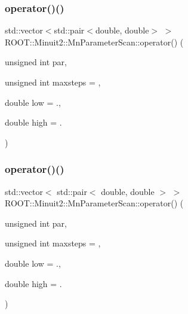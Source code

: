\mbox{\label{classROOT_1_1Minuit2_1_1MnParameterScan_aea28c9f299305c9ee1a0f5ad4b44a4e3}} 
\subsubsection{\texorpdfstring{operator()()}{operator()()}\hspace{0.1cm}{\footnotesize\ttfamily [1/2]}}
{\footnotesize\ttfamily std\+::vector$<$std\+::pair$<$double, double$>$ $>$ R\+O\+O\+T\+::\+Minuit2\+::\+Mn\+Parameter\+Scan\+::operator() (\begin{DoxyParamCaption}\item[{unsigned int}]{par,  }\item[{unsigned int}]{maxsteps = {},  }\item[{double}]{low = {.},  }\item[{double}]{high = {.} }\end{DoxyParamCaption})}

\mbox{\label{classROOT_1_1Minuit2_1_1MnParameterScan_a2548238382446f4774d43a4269dcebcf}} 
\subsubsection{\texorpdfstring{operator()()}{operator()()}\hspace{0.1cm}{\footnotesize\ttfamily [2/2]}}
{\footnotesize\ttfamily std\+::vector$<$ std\+::pair$<$ double, double $>$ $>$ R\+O\+O\+T\+::\+Minuit2\+::\+Mn\+Parameter\+Scan\+::operator() (\begin{DoxyParamCaption}\item[{unsigned int}]{par,  }\item[{unsigned int}]{maxsteps = {},  }\item[{double}]{low = {.},  }\item[{double}]{high = {.} }\end{DoxyParamCaption})}

